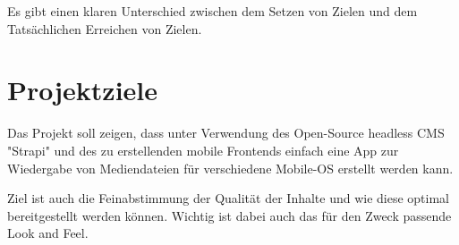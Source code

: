 \begin{spacing}{1}
    
    Es gibt einen klaren Unterschied zwischen dem Setzen von Zielen und dem Tatsächlichen Erreichen von Zielen.
    

    \cite{ziele}

    \section{Projektziele}
    Das Projekt soll zeigen, dass unter Verwendung des Open-Source headless CMS "Strapi" und des zu erstellenden mobile
    Frontends einfach eine App zur Wiedergabe von Mediendateien für verschiedene Mobile-OS erstellt werden kann.

    Ziel ist auch die Feinabstimmung der Qualität der Inhalte und wie diese optimal bereitgestellt werden können. 
    Wichtig ist dabei auch das für den Zweck passende Look and Feel.


\end{spacing}